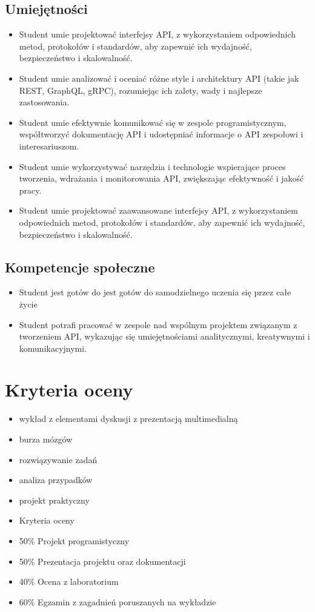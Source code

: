 \documentclass[12pt, a4paper]{article}
\begin{document}
\subsection*{Umiejętności}
\begin{itemize}
  \item Student umie projektować interfejsy API, z wykorzystaniem odpowiednich metod, protokołów i standardów, aby zapewnić ich wydajność, bezpieczeństwo i skalowalność.
  \item Student umie analizować i oceniać różne style i architektury API (takie jak REST, GraphQL, gRPC), rozumiejąc ich zalety, wady i najlepsze zastosowania.
  \item Student umie efektywnie komunikować się w zespole programistycznym, współtworzyć dokumentację API i udostępniać informacje o API zespołowi i interesariuszom.
  \item Student umie wykorzystywać narzędzia i technologie wspierające proces tworzenia, wdrażania i monitorowania API, zwiększając efektywność i jakość pracy.
  \item Student umie projektować zaawansowane interfejsy API, z wykorzystaniem odpowiednich metod, protokołów i standardów, aby zapewnić ich wydajność, bezpieczeństwo i skalowalność.
\end{itemize}

\subsection*{Kompetencje społeczne}
\begin{itemize}
  \item Student jest gotów do jest gotów do samodzielnego uczenia się przez całe życie
  \item Student potrafi pracować w zespole nad wspólnym projektem związanym z tworzeniem API, wykazując się umiejętnościami analitycznymi, kreatywnymi i komunikacyjnymi.
\end{itemize}

\section{Kryteria oceny}

\begin{itemize}
  \item wykład z elementami dyskusji z prezentacją multimedialną
  \item burza mózgów
  \item rozwiązywanie zadań
  \item analiza przypadków
  \item projekt praktyczny
  \item Kryteria oceny
  \item 50\% Projekt programistyczny
  \item 50\% Prezentacja projektu oraz dokumentacji
  \item 40\% Ocena z laboratorium
  \item 60\% Egzamin z zagadnień poruszanych na wykładzie
\end{itemize}
\end{document}
